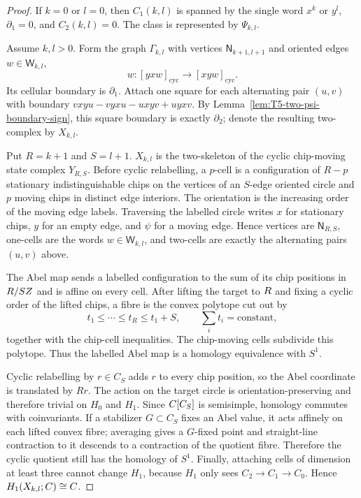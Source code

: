 \begin{proof}
  If \(k=0\) or \(l=0\), then \(C_1(k,l)\) is spanned by the single word
  \(x^k\) or \(y^l\), \(\partial_1=0\), and \(C_2(k,l)=0\).  The class is
  represented by \(\Psi_{k,l}\).

  Assume \(k,l>0\).  Form the graph \(\Gamma_{k,l}\) with vertices
  \(\mathsf N_{k+1,l+1}\) and oriented edges \(w\in\mathsf W_{k,l}\),
  \[
    w:[yxw]_{\mathrm{cyc}}\longrightarrow[xyw]_{\mathrm{cyc}}.
  \]
  Its cellular boundary is \(\partial_1\).  Attach one square for each
  alternating pair \((u,v)\) with boundary
  \(vxyu-vyxu-uxyv+uyxv\).  By
  Lemma~\ref{lem:T5-two-psi-boundary-sign}, this square boundary is
  exactly \(\partial_2\); denote the resulting two-complex by
  \(X_{k,l}\).

  Put \(R=k+1\) and \(S=l+1\).  \(X_{k,l}\) is the two-skeleton of the
  cyclic chip-moving state complex \(Y_{R,S}\).  Before cyclic
  relabelling, a \(p\)-cell is a configuration of \(R-p\) stationary
  indistinguishable chips on the vertices of an \(S\)-edge oriented
  circle and \(p\) moving chips in distinct edge interiors.  The
  orientation is the increasing order of the moving edge labels.
  Traversing the labelled circle writes \(x\) for stationary chips, \(y\)
  for an empty edge, and \(\psi\) for a moving edge.  Hence vertices are
  \(\mathsf N_{R,S}\), one-cells are the words \(w\in\mathsf W_{k,l}\),
  and two-cells are exactly the alternating pairs \((u,v)\) above.

  The Abel map sends a labelled configuration to the sum of its chip
  positions in \(R/SZ\) and is affine on every cell.  After lifting the
  target to \(R\) and fixing a cyclic order of the lifted chips, a fibre
  is the convex polytope cut out by
  \[
    t_1\leq\cdots\leq t_R\leq t_1+S,\qquad \sum_i t_i=\mathrm{constant},
  \]
  together with the chip-cell inequalities.  The chip-moving cells
  subdivide this polytope.  Thus the labelled Abel map is a homology
  equivalence with \(S^1\).

  Cyclic relabelling by \(r\in C_S\) adds \(r\) to every chip position, so
  the Abel coordinate is translated by \(Rr\).  The action on the target
  circle is orientation-preserving and therefore trivial on \(H_0\) and
  \(H_1\).  Since \(C[C_S]\) is semisimple, homology commutes with
  coinvariants.  If a stabilizer \(G\subset C_S\) fixes an Abel value, it
  acts affinely on each lifted convex fibre; averaging gives a
  \(G\)-fixed point and straight-line contraction to it descends to a
  contraction of the quotient fibre.  Therefore the cyclic quotient still
  has the homology of \(S^1\).  Finally, attaching cells of dimension
  at least three cannot change \(H_1\), because \(H_1\) only sees
  \(C_2\to C_1\to C_0\).  Hence \(H_1(X_{k,l};C)\cong C\).


\end{proof}
